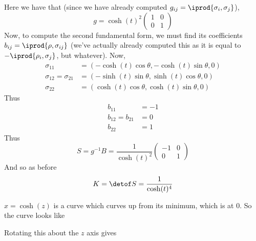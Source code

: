 \documentclass[10pt]{article}
\def\pmat#1{\begin{pmatrix} #1 \end{pmatrix}}
\def\pmat#1{\begin{pmatrix}#1\end{pmatrix}}
\begin{document}
        \item Here we have that (since we have already computed $g_{ij}=\iprod{\sigma_i,\sigma_j}$),
            \[ g = \cosh(t)^2\pmat{1 & 0 \\ 0 & 1} \]
            Now, to compute the second fundamental form, we must find its coefficients
            $b_{ij}=\iprod{\rho,\sigma_{ij}}$ (we've actually already computed this as it is equal to $-\iprod{\rho_i,\sigma_j}$, but whatever).
            Now,
            \begin{align*}
                \sigma_{11} &= (-\cosh(t)\cos\theta,-\cosh(t)\sin\theta,0) \\
                \sigma_{12} = \sigma_{21} &= (-\sinh(t)\sin\theta,\sinh(t)\cos\theta,0) \\
                \sigma_{22} &= (\cosh(t)\cos\theta,\cosh(t)\sin\theta,0)
            \end{align*}
            Thus
            \begin{align*}
                b_{11} &= -1 \\
                b_{12} = b_{21} &= 0 \\
                b_{22} &= 1
            \end{align*}
            Thus
            \[ S = g^{-1}B = \frac1{\cosh(t)^2}\pmat{-1 & 0 \\ 0 & 1} \]
            And so as before
            \[ K = \detof S = \frac1{\cosh(t)^4} \]

        \item $x=\cosh(z)$ is a curve which curves up from its minimum, which is at $0$.
            So the curve looks like

            \bgroup\centering
            \par\egroup

            Rotating this about the $z$ axis gives
\end{document}
